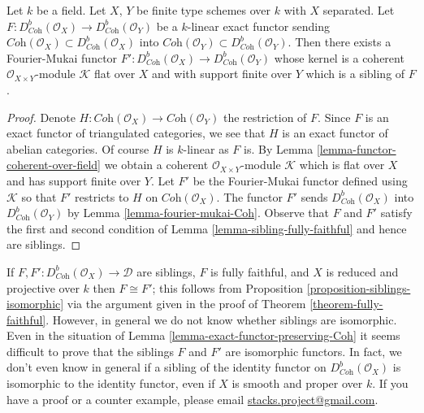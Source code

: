\begin{lemma}
\label{lemma-exact-functor-preserving-Coh}
Let $k$ be a field. Let $X$, $Y$ be finite type schemes over $k$ with
$X$ separated. Let
$F : D^b_{\textit{Coh}}(\mathcal{O}_X) \to D^b_{\textit{Coh}}(\mathcal{O}_Y)$
be a $k$-linear exact functor sending
$\textit{Coh}(\mathcal{O}_X) \subset D^b_{\textit{Coh}}(\mathcal{O}_X)$
into
$\textit{Coh}(\mathcal{O}_Y) \subset D^b_{\textit{Coh}}(\mathcal{O}_Y)$.
Then there exists a Fourier-Mukai functor
$F' : D^b_{\textit{Coh}}(\mathcal{O}_X) \to D^b_{\textit{Coh}}(\mathcal{O}_Y)$
whose kernel is a coherent $\mathcal{O}_{X \times Y}$-module $\mathcal{K}$
flat over $X$ and with support finite over $Y$ which is a sibling of $F$.
\end{lemma}

\begin{proof}
Denote $H : \textit{Coh}(\mathcal{O}_X) \to \textit{Coh}(\mathcal{O}_Y)$
the restriction of $F$. Since $F$ is an exact functor of triangulated
categories, we see that $H$ is an exact functor of abelian categories.
Of course $H$ is $k$-linear as $F$ is. By
Lemma \ref{lemma-functor-coherent-over-field}
we obtain a coherent $\mathcal{O}_{X \times Y}$-module
$\mathcal{K}$ which is flat over $X$ and has support finite over $Y$.
Let $F'$ be the Fourier-Mukai functor defined using $\mathcal{K}$
so that $F'$ restricts to $H$ on $ \textit{Coh}(\mathcal{O}_X)$.
The functor $F'$ sends $D^b_{\textit{Coh}}(\mathcal{O}_X)$
into $D^b_{\textit{Coh}}(\mathcal{O}_Y)$ by
Lemma \ref{lemma-fourier-mukai-Coh}.
Observe that $F$ and $F'$ satisfy the first and second
condition of Lemma \ref{lemma-sibling-fully-faithful} and hence are siblings.
\end{proof}

\begin{remark}
\label{remark-difficult}
If $F, F' : D^b_{\textit{Coh}}(\mathcal{O}_X) \to \mathcal{D}$ are siblings, $F$
is fully faithful, and $X$ is reduced and projective over $k$ then
$F \cong F'$; this follows from
Proposition \ref{proposition-siblings-isomorphic} via the argument
given in the proof of Theorem \ref{theorem-fully-faithful}.
However, in general we do not know whether siblings are isomorphic.
Even in the situation of Lemma \ref{lemma-exact-functor-preserving-Coh}
it seems difficult to prove that the siblings $F$ and $F'$
are isomorphic functors. In fact, we don't even know in general
if a sibling of the identity functor on $D^b_{\textit{Coh}}(\mathcal{O}_X)$
is isomorphic to the identity functor, even if $X$ is smooth and proper
over $k$. If you have a proof or a counter example, please email
\href{mailto:stacks.project@gmail.com}{stacks.project@gmail.com}.
\end{remark}

